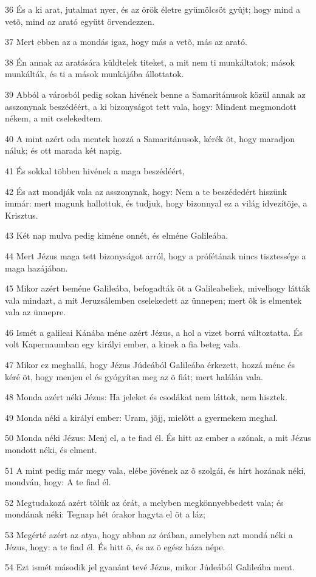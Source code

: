 \par 36 És a ki arat, jutalmat nyer, és az örök életre gyümölcsöt gyûjt; hogy mind a vetõ, mind az arató együtt örvendezzen.
\par 37 Mert ebben az a mondás igaz, hogy más a vetõ, más az arató.
\par 38 Én annak az aratására küldtelek titeket, a mit nem ti munkáltatok; mások munkálták, és ti a mások munkájába állottatok.
\par 39 Abból a városból pedig sokan hivének benne a Samaritánusok közül annak az asszonynak beszédéért, a ki bizonyságot tett vala, hogy: Mindent megmondott nékem, a mit cselekedtem.
\par 40 A mint azért oda mentek hozzá a Samaritánusok, kérék õt, hogy maradjon náluk; és ott marada két napig.
\par 41 És sokkal többen hivének a maga beszédéért,
\par 42 És azt mondják vala az asszonynak, hogy: Nem a te beszédedért hiszünk immár: mert magunk hallottuk, és tudjuk, hogy bizonnyal ez a világ idvezítõje, a Krisztus.
\par 43 Két nap mulva pedig kiméne onnét, és elméne Galileába.
\par 44 Mert Jézus maga tett bizonyságot arról, hogy a prófétának nincs tisztessége a maga hazájában.
\par 45 Mikor azért beméne Galileába, befogadták õt a Galileabeliek, mivelhogy látták vala mindazt, a mit Jeruzsálemben cselekedett az ünnepen; mert õk is elmentek vala az ünnepre.
\par 46 Ismét a galileai Kánába méne azért Jézus, a hol a vizet borrá változtatta. És volt Kapernaumban egy királyi ember, a kinek a fia beteg vala.
\par 47 Mikor ez meghallá, hogy Jézus Júdeából Galileába érkezett, hozzá méne és kéré õt, hogy menjen el és gyógyítsa meg az õ fiát; mert halálán vala.
\par 48 Monda azért néki Jézus: Ha jeleket és csodákat nem láttok, nem hisztek.
\par 49 Monda néki a királyi ember: Uram, jõjj, mielõtt a gyermekem meghal.
\par 50 Monda néki Jézus: Menj el, a te fiad él. És hitt az ember a szónak, a mit Jézus mondott néki, és elment.
\par 51 A mint pedig már megy vala, elébe jövének az õ szolgái, és hírt hozának néki, mondván, hogy: A te fiad él.
\par 52 Megtudakozá azért tõlük az órát, a melyben megkönnyebbedett vala; és mondának néki: Tegnap hét órakor hagyta el õt a láz;
\par 53 Megérté azért az atya, hogy abban az órában, amelyben azt mondá néki a Jézus, hogy: a te fiad él. És hitt õ, és az õ egész háza népe.
\par 54 Ezt ismét második jel gyanánt tevé Jézus, mikor Júdeából Galileába ment.

